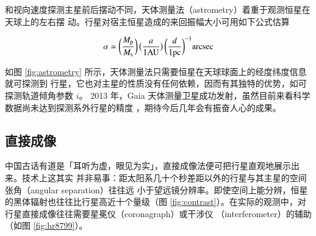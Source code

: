 和视向速度探测主星前后摆动不同，天体测量法（astrometry）着重于观测恒星在天球上的左右摆
动。行星对宿主恒星造成的来回振幅大小可用如下公式估算

\begin{equation}  \label{eq:astrometry} 
\alpha \simeq \bigg(\frac{M_\mathrm{p}}{M_\mathrm{s}}\bigg) \, \big(\frac{a}{1 \mathrm{AU}}\big) \, \bigg(\frac{d}{1 \mathrm{pc}}\bigg)^{-1} \mathrm{arcsec}
\end{equation} %

如图 \ref{fig:astrometry} 所示，天体测量法只需要恒星在天球球面上的经度纬度信息就可探测到
行星，它也对主星的性质没有任何依赖，因而有其独特的优势，如可探测轨道倾角参数 $i$。
2013 年，Gaia 天体测量卫星成功发射，虽然目前来看科学数据尚未达到探测系外行星的精度
\cite{GaiaCo2016}，期待今后几年会有振奋人心的成果。


\subsection{直接成像}  \label{sec:drctimgmeth}
中国古话有道是「耳听为虚，眼见为实」，直接成像法便可把行星直观地展示出来。技术上这其实
并非易事：距太阳系几十个秒差距以外的行星与其主星的空间张角（angular separation）往往远
小于望远镜分辨率。即使空间上能分辨，恒星的黑体辐射也往往比行星高近十个量级（图 
\ref{fig:contrast}）。在实际的观测中，对行星直接成像往往需要星冕仪（coronagraph）或干涉仪
（interferometer）的辅助（如图 \ref{fig:hr8799}）。

